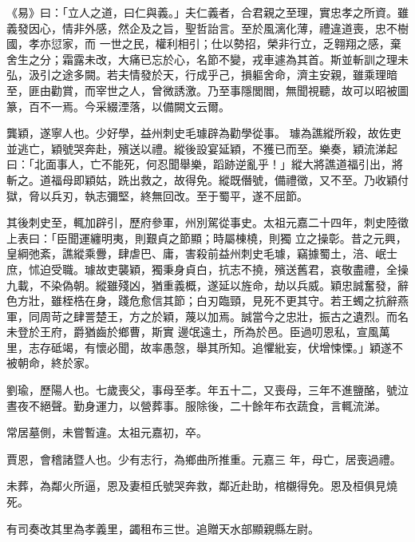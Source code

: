 
\begin{pinyinscope}

 《易》曰：「立人之道，曰仁與義。」夫仁義者，合君親之至理，實忠孝之所資。雖義發因心，情非外感，然企及之旨，聖哲詒言。至於風漓化薄，禮違道喪，忠不樹國，孝亦愆家，而
 一世之民，權利相引；仕以勢招，榮非行立，乏翱翔之感，棄舍生之分；霜露未改，大痛已忘於心，名節不變，戎車遽為其首。斯並斬訓之理未弘，汲引之途多闕。若夫情發於天，行成乎己，損軀舍命，濟主安親，雖乘理暗至，匪由勸賞，而宰世之人，曾微誘激。乃至事隱閭閻，無聞視聽，故可以昭被圖篆，百不一焉。今采綴湮落，以備闕文云爾。



 龔穎，遂寧人也。少好學，益州刺史毛璩辟為勸學從事。
 璩為譙縱所殺，故佐吏並逃亡，穎號哭奔赴，殯送以禮。縱後設宴延穎，不獲已而至。樂奏，穎流涕起曰：「北面事人，亡不能死，何忍聞舉樂，蹈跡逆亂乎！」縱大將譙道福引出，將斬之。道福母即穎姑，跣出救之，故得免。縱既僭號，備禮徵，又不至。乃收穎付獄，脅以兵刃，執志彌堅，終無回改。至于蜀平，遂不屈節。



 其後刺史至，輒加辟引，歷府參軍，州別駕從事史。太祖元嘉二十四年，刺史陸徵上表曰：「臣聞運纏明夷，則艱貞之節顯；時屬棟橈，則獨
 立之操彰。昔之元興，皇綱弛紊，譙縱乘釁，肆虐巴、庸，害殺前益州刺史毛璩，竊據蜀土，涪、岷士庶，怵迫受職。璩故吏襲穎，獨秉身貞白，抗志不撓，殯送舊君，哀敬盡禮，全操九載，不染偽朝。縱雖殘凶，猶重義概，遂延以旌命，劫以兵威。穎忠誠奮發，辭色方壯，雖桎梏在身，踐危愈信其節；白刃臨頸，見死不更其守。若王蠋之抗辭燕軍，同周苛之肆詈楚王，方之於穎，蔑以加焉。誠當今之忠壯，振古之遺烈。而名未登於王府，爵猶齒於鄉曹，斯實
 邊氓遠土，所為於邑。臣過叨恩私，宣風萬里，志存砥竭，有懷必聞，故率愚愨，舉其所知。追懼紕妄，伏增悚慄。」穎遂不被朝命，終於家。



 劉瑜，歷陽人也。七歲喪父，事母至孝。年五十二，又喪母，三年不進鹽酪，號泣晝夜不絕聲。勤身運力，以營葬事。服除後，二十餘年布衣蔬食，言輒流涕。



 常居墓側，未嘗暫違。太祖元嘉初，卒。



 賈恩，會稽諸暨人也。少有志行，為鄉曲所推重。元嘉三
 年，母亡，居喪過禮。



 未葬，為鄰火所逼，恩及妻桓氏號哭奔救，鄰近赴助，棺櫬得免。恩及桓俱見燒死。



 有司奏改其里為孝義里，蠲租布三世。追贈天水部顯親縣左尉。




\end{pinyinscope}
